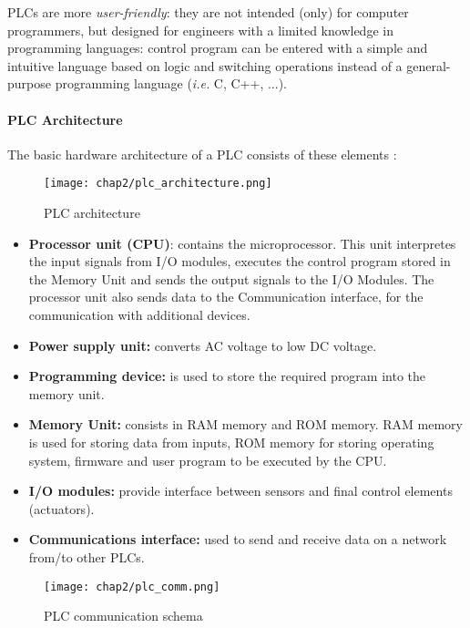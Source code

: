\bigskip
PLCs are more \textit{user-friendly}: they are not intended (only) for computer programmers, but designed for engineers with a limited knowledge in programming languages: control program can be entered with a simple and intuitive language based on logic and switching operations instead of a general-purpose programming language (\textit{i.e.} C, C++, ...). 

\paragraph{PLC Architecture}
The basic hardware architecture of a PLC consists of these elements \cite{plc_book}:

\begin{figure}[ht]
	\centering
	\texttt{[image: chap2/plc\_architecture.png]}
	\caption{PLC architecture}
	\label{fig:PLC_architecture}
\end{figure}

\begin{itemize}
	\item \textbf{Processor unit (CPU)}: contains the microprocessor. This unit interpretes the input signals from I/O modules, executes the control program stored in the Memory Unit and sends the output signals to the I/O Modules.
	The processor unit also sends data to the Communication interface, for the communication with additional devices.
	
	\item \textbf{Power supply unit:} converts AC voltage to low DC voltage.
	
	\item \textbf{Programming device:} is used to store the required program into the memory unit.
	
	\item \textbf{Memory Unit:} consists in RAM memory and ROM memory. RAM memory is used for storing data from inputs, ROM memory for storing operating system, firmware and user program to be executed by the CPU.
	
	\item \textbf{I/O modules:} provide interface between sensors and final control elements (actuators).
	
	\item \textbf{Communications interface:} used to send and receive data on a network from/to other PLCs.
\end{itemize}

\begin{figure}[ht]
	\centering
	\texttt{[image: chap2/plc\_comm.png]}
	\caption{PLC communication schema}
	\label{fig:PLC_comm}
\end{figure}

